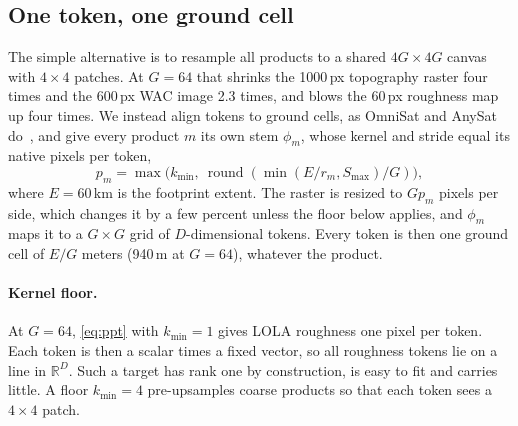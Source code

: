 \subsection{One token, one ground cell}
\label{sec:tokens}

The simple alternative is to resample all products to a shared $4G\times4G$ canvas with $4\times4$ patches. At $G{=}64$ that shrinks the 1000\,px topography raster four times and the 600\,px WAC image 2.3 times, and blows the 60\,px roughness map up four times. We instead align tokens to ground cells, as OmniSat and AnySat do~\cite{astruc2024omnisat,astruc2025anysat}, and give every product $m$ its own stem $\phi_m$, whose kernel and stride equal its native pixels per token,
\begin{equation}
  p_m = \max\!\big(k_{\min},\ \operatorname{round}(\min(E/r_m, S_{\max})/G)\big),
  \label{eq:ppt}
\end{equation}
where $E{=}60$\,km is the footprint extent. The raster is resized to $Gp_m$ pixels per side, which changes it by a few percent unless the floor below applies, and $\phi_m$ maps it to a $G\times G$ grid of $D$-dimensional tokens. Every token is then one ground cell of $E/G$ meters (940\,m at $G{=}64$), whatever the product.

\paragraph{Kernel floor.} At $G{=}64$, \cref{eq:ppt} with $k_{\min}{=}1$ gives LOLA roughness one pixel per token. Each token is then a scalar times a fixed vector, so all roughness tokens lie on a line in $\mathbb{R}^D$. Such a target has rank one by construction, is easy to fit and carries little. A floor $k_{\min}{=}4$ pre-upsamples coarse products so that each token sees a $4\times4$ patch.

